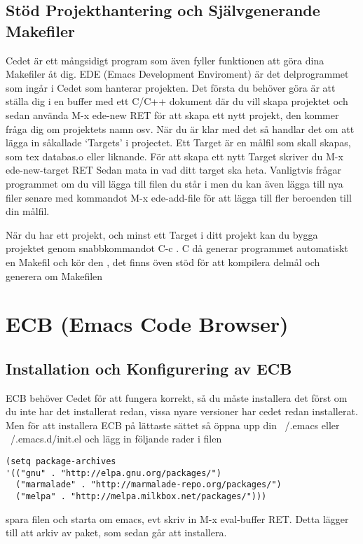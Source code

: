 \documentclass[12pt]{article} %
\begin{document}
\subsection{Stöd Projekthantering och Självgenerande Makefiler}
Cedet är ett mångsidigt program som även fyller funktionen att göra dina Makefiler åt dig. EDE (Emacs Development Enviroment) är det delprogrammet som ingår i Cedet som hanterar projekten. Det första du behöver göra är att ställa dig i en buffer med ett C/C++ dokument där du vill skapa projektet och sedan använda M-x ede-new RET för att skapa ett nytt projekt, den kommer fråga dig om projektets namn osv. När du är klar med det så handlar det om att lägga in såkallade `Targets' i projectet. Ett Target är en målfil som skall skapas, som tex databas.o eller liknande. För att skapa ett nytt Target skriver du M-x ede-new-target RET Sedan mata in vad ditt target ska heta. Vanligtvis frågar programmet om du vill lägga till filen du står i men du kan även lägga till nya filer senare med kommandot M-x ede-add-file för att lägga till fler beroenden till din målfil.

När du har ett projekt, och minst ett Target i ditt projekt kan du bygga projektet genom snabbkommandot C-c . C då generar programmet automatiskt en Makefil och kör den , det finns öven stöd för att kompilera delmål och generera om Makefilen  

\newpage
\section{ECB (Emacs Code Browser)}

\subsection{Installation och Konfigurering av ECB}
ECB behöver Cedet för att fungera korrekt, så du måste installera det först om du inte har det installerat redan, vissa nyare versioner har cedet redan installerat. Men för att installera ECB på lättaste sättet så öppna upp din ~/.emacs eller ~/.emacs.d/init.el och lägg in följande rader i filen
\begin{lstlisting}
(setq package-archives 
'(("gnu" . "http://elpa.gnu.org/packages/")
  ("marmalade" . "http://marmalade-repo.org/packages/")
  ("melpa" . "http://melpa.milkbox.net/packages/")))
\end{lstlisting}
spara filen och starta om emacs, evt skriv in M-x eval-buffer RET. Detta lägger till att arkiv av paket, som sedan går att installera.
\end{document}
